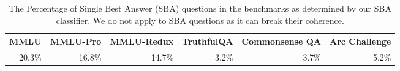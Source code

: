 \begin{table*}[t!]
\begin{adjustbox}{max width=1.0\linewidth}
\begin{tabular}{rrrrrr}
\toprule
\textbf{MMLU}&\textbf{MMLU-Pro}&\textbf{MMLU-Redux}&\textbf{TruthfulQA}&\textbf{Commonsense QA} & \textbf{Arc Challenge}\\
\midrule
20.3\%&16.8\%&14.7\%&3.2\%&3.7\%&5.2\%\\
\bottomrule
\end{tabular}
\end{adjustbox}
\caption{The Percentage of Single Best Answer (SBA) questions in the benchmarks as determined by our SBA classifier. We do not apply \wicd\space to SBA questions as it can break their coherence.
}
\label{tab:sba-percentages}
\end{table*}